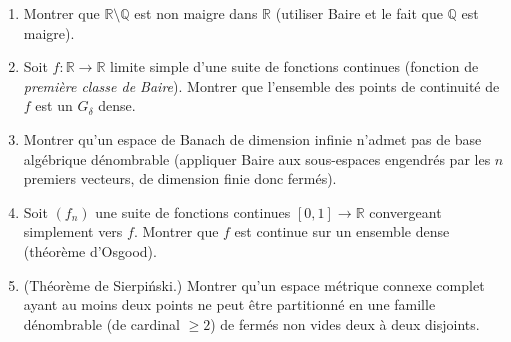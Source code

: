 \vspace{6pt}
\exolabel

\begin{mdframed}[style=exobar]
  \begin{enumerate}
    \item Montrer que $\mathbb{R}\setminus\mathbb{Q}$ est non maigre dans
          $\mathbb{R}$ (utiliser Baire et le fait que $\mathbb{Q}$ est maigre).

    \item Soit $f : \mathbb{R}\to\mathbb{R}$ limite simple d'une suite de
          fonctions continues (fonction de \emph{première classe de Baire}).
          Montrer que l'ensemble des points de continuité de $f$ est un
          $G_\delta$ dense.

    \item Montrer qu'un espace de Banach de dimension infinie n'admet pas de
          base algébrique dénombrable (appliquer Baire aux sous-espaces
          engendrés par les $n$ premiers vecteurs, de dimension finie donc
          fermés).

    \item Soit $(f_n)$ une suite de fonctions continues $[0,1]\to\mathbb{R}$
          convergeant simplement vers $f$. Montrer que $f$ est continue sur
          un ensemble dense (théorème d'Osgood).

    \item (Théorème de Sierpiński.) Montrer qu'un espace métrique connexe
          complet ayant au moins deux points ne peut être partitionné en une
          famille dénombrable (de cardinal $\geq 2$) de fermés non vides deux à
          deux disjoints.
  \end{enumerate}
\end{mdframed}

